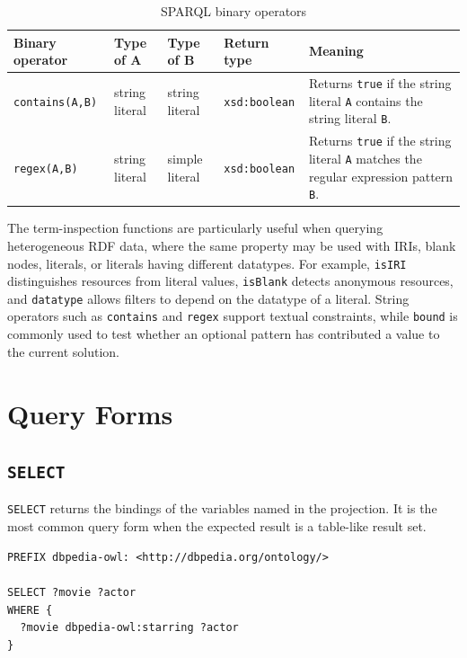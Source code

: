 \documentclass{scrbook}
\begin{document}
	\begin{table}
		\begin{tabularx}{\linewidth}{|X|p{5em}|p{5em}|p{6.5em}|X|}\hline
			\textbf{Binary operator} & \textbf{Type of A} & \textbf{Type of B} & \textbf{Return type} & \textbf{Meaning} \\
			\hline
			
			\texttt{contains(A,B)} & string literal & string literal & \texttt{xsd:boolean} & Returns \texttt{true} if the string literal \texttt{A} contains the string literal \texttt{B}. \\ \hline
			
			\texttt{regex(A,B)} & string literal & simple literal & \texttt{xsd:boolean} & Returns \texttt{true} if the string literal \texttt{A} matches the regular expression pattern \texttt{B}. \\ \hline
		\end{tabularx}
		\caption{SPARQL binary operators}
		\label{tbl:binary_operators}
	\end{table}
	
	The term-inspection functions are particularly useful when querying heterogeneous RDF data, where the same property may be used with IRIs, blank nodes, literals, or literals having different datatypes. For example, \texttt{isIRI} distinguishes resources from literal values, \texttt{isBlank} detects anonymous resources, and \texttt{datatype} allows filters to depend on the datatype of a literal. String operators such as \texttt{contains} and \texttt{regex} support textual constraints, while \texttt{bound} is commonly used to test whether an optional pattern has contributed a value to the current solution.
	
	\section{Query Forms}
	
	\subsection{\texttt{SELECT}}
	
	\texttt{SELECT} returns the bindings of the variables named in the projection. It is the most common query form when the expected result is a table-like result set.
	
	\begin{lstlisting}
PREFIX dbpedia-owl: <http://dbpedia.org/ontology/>

SELECT ?movie ?actor
WHERE {
  ?movie dbpedia-owl:starring ?actor
}
	\end{lstlisting}
	
\end{document}
